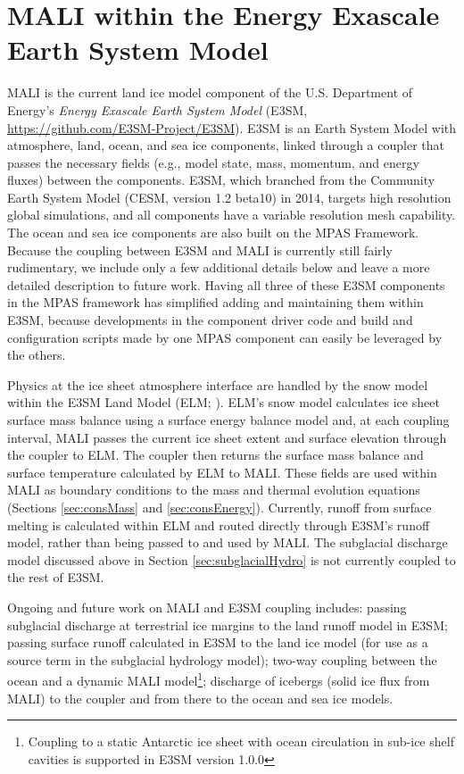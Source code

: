 \chapter{MALI within the Energy Exascale Earth System Model}
\label{chap:climatemodel_landice_coupling}

MALI is the current land ice model component of the U.S. Department of Energy's \textit{Energy Exascale Earth System Model} (E3SM, \url{https://github.com/E3SM-Project/E3SM}). 
E3SM is an Earth System Model with atmosphere, land, ocean, and sea ice components, linked through a coupler
that passes the necessary fields (e.g., model state, mass, momentum, and energy fluxes) between the components.
E3SM, which branched from the Community Earth System Model (CESM, version 1.2 beta10) in 2014, targets high resolution global simulations, and all components have a variable resolution mesh capability. The ocean \citep{Ringler2013,Petersen2015,Petersen2018} and sea ice \citep{Turner2018} components are also built on the MPAS Framework. Because the coupling between E3SM and MALI is currently still fairly rudimentary, we include only a few additional details below and leave a more detailed description to future work. 
Having all three of these E3SM components in the MPAS framework has simplified adding and maintaining them within E3SM,
because developments in the component driver code and build and configuration scripts made by one MPAS component can easily be leveraged by the others.

Physics at the ice sheet atmosphere interface are handled by the snow model within the E3SM Land Model (ELM; \cite{ELM2018a,ELM2018b}). ELM's snow model calculates ice sheet surface mass balance using a surface energy balance model and, at each coupling interval, MALI passes the current ice sheet extent and surface elevation through the coupler to ELM. The coupler then returns the surface mass balance and surface temperature calculated by ELM to MALI. These fields are used within MALI as boundary conditions to the mass and thermal evolution equations (Sections \ref{sec:consMass} and \ref{sec:consEnergy}). Currently, runoff from surface melting is calculated within ELM and routed directly through E3SM's runoff model, rather than being passed to and used by MALI. The subglacial discharge model discussed above in Section \ref{sec:subglacialHydro} is not currently coupled to the rest of E3SM. 

Ongoing and future work on MALI and E3SM coupling includes: passing subglacial discharge at terrestrial ice margins to the land runoff model in E3SM; passing surface runoff calculated in E3SM to the land ice model (for use as a source term in the subglacial hydrology model); two-way coupling between the ocean and a dynamic MALI model\footnote{Coupling to a static Antarctic ice sheet with ocean circulation in sub-ice shelf cavities is supported in E3SM version 1.0.0}; discharge of icebergs (solid ice flux from MALI) to the coupler and from there to the ocean and sea ice models.
